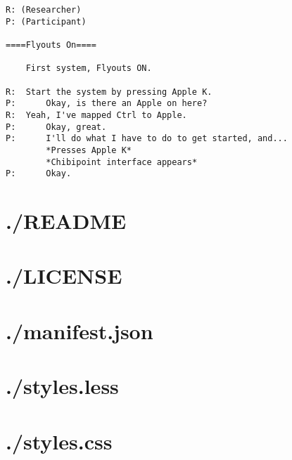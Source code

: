 \documentclass[11pt,openright,a4paper]{report}
\begin{document}
    \begin{lstlisting}[caption={Transcript of Usability Study}, label={lst:usabilityTrans}, language=custom, style=basic, columns=fixed]
R: (Researcher)
P: (Participant)

====Flyouts On====

    First system, Flyouts ON.

R:  Start the system by pressing Apple K.
P:      Okay, is there an Apple on here?
R:  Yeah, I've mapped Ctrl to Apple.
P:      Okay, great.
P:      I'll do what I have to do to get started, and...
        *Presses Apple K*
        *Chibipoint interface appears*
P:      Okay.
\end{lstlisting}

\begin{landscape}
\begin{multicols}{2}
\newcommand{\mycodeinclude}[2]{

\section{./#2}

}

\newcommand{\mycodeincludejs}[1]{
\mycodeinclude{language=custom, alsolanguage=JavaScript, style=whatever}{#1}
}

\newcommand{\mycodeincludecss}[1]{
\mycodeinclude{language=custom, style=whatever}{#1}
}

\newcommand{\mycodeincludejson}[1]{
\mycodeinclude{language=custom, alsolanguage=JavaScript, style=whatever}{#1}
}

\newcommand{\mycodeincludeplain}[1]{
\mycodeinclude{language=custom, style=whatever}{#1}
}

% 

\mycodeincludeplain{README}
\mycodeincludeplain{LICENSE}

\mycodeincludejson{manifest.json}
\mycodeincludecss{styles.less}
\mycodeincludecss{styles.css}


\end{multicols}
\end{landscape}
\end{document}
